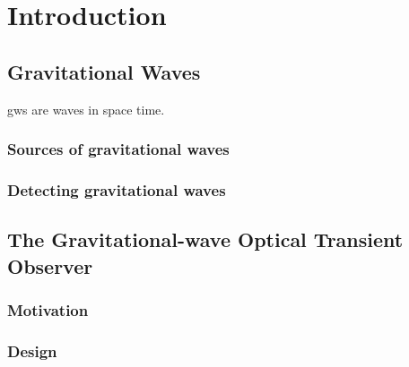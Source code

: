 \chapter{Introduction}
\label{chap:intro}
\chaptoc{}

\newpage
\section{Gravitational Waves}
\label{sec:gw}

\glspl{gw} are waves in space time.

\lipsum{}


\subsection{Sources of gravitational waves}
\label{sec:gw-sources}

\lipsum{}


\subsection{Detecting gravitational waves}
\label{sec:gw-detect}

\lipsum{}


\newpage
\section{The Gravitational-wave Optical Transient Observer}
\label{sec:goto}

\lipsum{}

\subsection{Motivation}
\label{sec:gw-motivation}

\lipsum{}

\subsection{Design}
\label{sec:gw-design}

\lipsum{}
